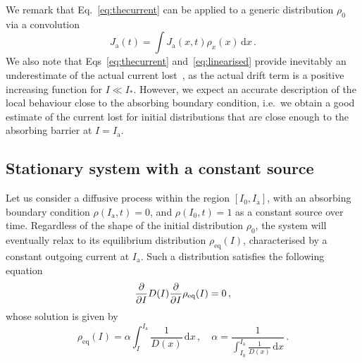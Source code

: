 We remark that Eq.~\eqref{eq:thecurrent} can be applied to a generic distribution $\rho_0$ via a convolution
\begin{equation}
    J_\mathrm{a}(t) = \int J_\mathrm{a}(x,t)\rho_x(x)\,\mathrm{d}x\,.
    \label{eq:current_convolution}
\end{equation}
We also note that Eqs~\eqref{eq:thecurrent} and~\eqref{eq:linearised} provide inevitably an underestimate of the actual current lost~\cite{montanari:ipac2021:tupab233}, as the actual drift term is a positive increasing function for $I\ll I_\ast$. However, we expect an accurate description of the local behaviour close to the absorbing boundary condition, i.e.\ we obtain a good estimate of the current lost for initial distributions that are close enough to the absorbing barrier at $I=I_\mathrm{a}$. 


\subsection{Stationary system with a constant  source}\label{subsec:system_infinite_regime}


Let us consider a diffusive process within the region $[I_0, I_\mathrm{a}]$, with an absorbing boundary condition $\rho(I_\mathrm{a}, t) = 0$, and $\rho(I_0, t) = 1$ as a constant source over time. Regardless of the shape of the initial distribution $\rho_0$, the system will eventually relax to its equilibrium distribution $\rho_\text{eq}(I)$, characterised by a constant outgoing current at $I_\mathrm{a}$. Such a distribution satisfies the following equation
\begin{equation}
    \pdv{I} D(I) \pdv{I} \rho_{\text{eq}}(I) = 0 \,,
\end{equation}
whose solution is given by
\begin{equation}
    \rho_\text{eq}(I) = \alpha \int_I^{I_\mathrm{a}} \frac{1}{D(x)}\,\mathrm{d}x \,, \quad \alpha = \frac{1}{ \displaystyle{\int_{I_0}^{I_\mathrm{a}} \frac{1}{D(x)}\,\mathrm{d}x}} \, .
    \label{eq:equilibrium_stationary_distribution}
\end{equation}

